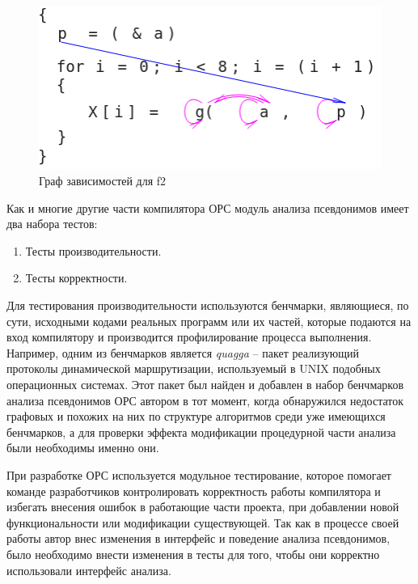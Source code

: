 \begin{figure}[H]
\centering
\includegraphics[width=1\textwidth]{img/opsDepGraphGood_alpha.png}
\caption{Граф зависимостей для f2}
\label{fig:depgraphGood}
\end{figure}

Как и многие другие части компилятора ОРС модуль анализа псевдонимов имеет два набора тестов:
\begin{enumerate}
    \item Тесты производительности.
    \item Тесты корректности.
\end{enumerate}

Для тестирования производительности используются бенчмарки, являющиеся, по сути, исходными кодами реальных программ или их частей, которые подаются на вход компилятору и производится профилирование процесса выполнения. Например, одним из бенчмарков является \textit{quagga} -- пакет реализующий протоколы динамической маршрутизации, используемый в UNIX подобных операционных системах. Этот пакет был найден и добавлен в набор бенчмарков анализа псевдонимов ОРС автором в тот момент, когда обнаружился недостаток графовых и похожих на них по структуре алгоритмов среди уже имеющихся бенчмарков, а для проверки эффекта модификации процедурной части анализа были необходимы именно они.

При разработке ОРС используется модульное тестирование, которое помогает команде разработчиков контролировать корректность работы компилятора и избегать внесения ошибок в работающие части проекта, при добавлении новой функциональности или модификации существующей. Так как в процессе своей работы автор внес изменения в интерфейс и поведение анализа псевдонимов, было необходимо внести изменения в тесты для того, чтобы они корректно использовали интерфейс анализа.

